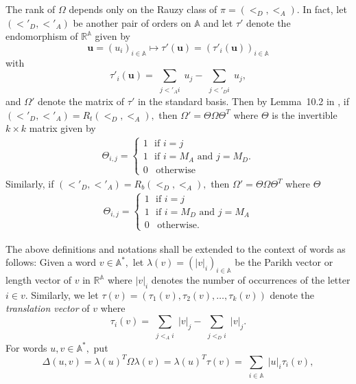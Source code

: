 \documentclass[12pt,a4paper]{amsart}
\newcommand{\reals}{{\mathbb R}}
\newcommand{\A}{{\mathbb A}}
\newtheorem{lemma}{Lemma}
\begin{document}
The rank of $\Omega$ depends only on the Rauzy class of  $\pi=(<_D,<_A).$  In fact, let $(<'_D,<'_A)$ be another pair of orders on $\A$ and let $\tau'$ denote the endomorphism of $\reals^{\A}$ given by 
\[ \mathbf u=(u_i)_{i\in \A} \mapsto \tau' (\mathbf u)=(\tau'_i(\mathbf u))_{i\in \A}\] with
\[\tau'_i(\mathbf u)=\sum_{\substack{j<'_A i}}u_j
        -\sum_{\substack{j<'_D i}}u_j,\] and $\Omega'$ denote the matrix of $\tau'$ in the standard basis. 
        Then by Lemma~10.2 in \cite{via}, if 
$(<'_D,<'_A)=R_t(<_D,<_A),$ then  $\Omega'=\Theta \Omega \Theta ^T$ where $\Theta$ is the invertible $k\times k$ matrix given by
\begin{align}\Theta_{i,j}= \begin{cases} 1\,\,\,\, \text{if  $i= j$}\\ 
1\,\,\,\, \text{if  $i=M_A$ and $j=M_D.$}\\0\,\,\,\,\, \text{otherwise} \end{cases}
\end{align}   
 Similarly, if $(<'_D,<'_A)=R_b(<_D,<_A),$ then $\Omega'=\Theta \Omega \Theta ^T$ where $\Theta$ \begin{align}\Theta_{i,j}= \begin{cases} 1\,\,\,\, \text{if  $i= j$}\\ 
1\,\,\,\, \text{if  $i=M_D$ and $j=M_A$}\\0\,\,\,\,\, \text{otherwise.} \end{cases}
\end{align}         

\vspace{.15 in}
 
        
        




The above definitions and notations shall be extended to the context of words as follows: Given a word $v\in \A^*,$  let $\lambda (v)=(|v|_i)_{i\in \A}$  be the Parikh vector or length vector of $v$ in $\reals^\A$  where $|v|_i$ denotes  the number of occurrences of the letter $i\in v.$ Similarly, we let 
$ \tau (v)=(\tau_1(v), \tau_2(v), \ldots ,\tau_k(v))$ denote the {\it translation vector} of $v$ where
\[\tau_i(v)=\sum_{\substack{j<_A i}}|v|_j
        -\sum_{\substack{j<_D i}}|v|_j.\]
For words $u, v\in \A^*,$ put  \[\Delta (u,v)=\lambda(u)^T\Omega \lambda(v)=\lambda (u)^T \tau(v)=\sum_{\substack{i\in \A}}|u|_i\tau_i(v),\]
\end{document}
